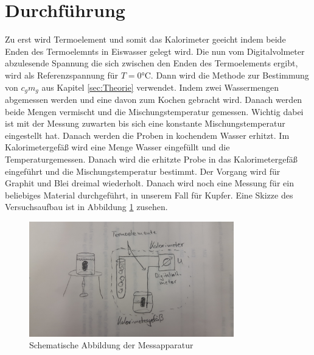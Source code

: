 \section{Durchführung}
\label{sec:Durchführung}
Zu erst wird Termoelement und somit das Kalorimeter geeicht indem
beide Enden des Termoelemnts in Eiswasser gelegt wird. Die nun vom Digitalvolmeter
abzulesende Spannung die sich zwischen den Enden des Termoelements ergibt, wird
als Referenzspannung für $T = 0 \si{\celsius}$.
Dann wird die Methode zur Bestimmung von $c_gm_g$ aus Kapitel \ref{sec:Theorie}
verwendet. Indem zwei Wassermengen abgemessen werden und eine davon zum Kochen
gebracht wird. Danach werden beide Mengen vermischt und die Mischungstemperatur
gemessen. Wichtig dabei ist mit der Messung zuwarten bis sich eine konstante
Mischungstemperatur eingestellt hat. Danach werden die Proben in kochendem
Wasser erhitzt. Im Kalorimetergefäß wird eine Menge Wasser eingefüllt und die
Temperaturgemessen. Danach wird die erhitzte Probe in das Kalorimetergefäß
eingeführt und die Mischungstemperatur bestimmt.
Der Vorgang wird für Graphit und Blei dreimal wiederholt.  Danach wird noch eine
Messung für ein beliebiges Material durchgeführt, in unserem Fall für Kupfer.
Eine Skizze des Versuchsaufbau ist in Abbildung \ref{fig:skizze} zusehen.

\begin{figure}
  \centering
  \includegraphics[height=5cm]{logos/skizze.jpg}
  \caption{Schematische Abbildung der Messapparatur \cite{Anleitung}}
  \label{fig:skizze}
\end{figure}
